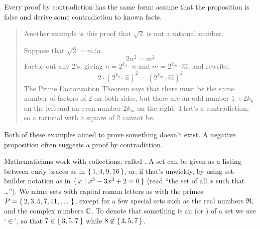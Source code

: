 Every proof by contradiction has the same form: assume that the proposition is
false and derive some contradiction to known facts.

\begin{quote}\small
Another example is this proof that
\( \sqrt{2} \) is not a rational number.

Suppose that  \( \sqrt{2}=m/n \).
\begin{equation*}
   2n^2=m^2
\end{equation*}
Factor out any \( 2 \)'s, giving
\( n=2^{k_n}\cdot \hat{n} \)
and
\( m=2^{k_m}\cdot \hat{m} \),
and rewrite.
\begin{equation*}
  2\cdot (2^{k_n}\cdot \hat{n})^2
  =
  (2^{k_m}\cdot \hat{m})^2
\end{equation*}
The Prime Factorization Theorem says that there must be the same number of
factors of \( 2 \) on both sides, but there are an odd number
\( 1+2k_n \) on the left and an even number \( 2k_m \) on the right.
That's a contradiction, so a rational with a square of
\( 2 \) cannot be.
\end{quote}

Both of these examples aimed to prove something doesn't exist.
A negative proposition often suggests a proof by contradiction.














{}
Mathematicians work with collections, called . 
A set can be given as a listing between curly braces as in
\( \mbox{$\{\, 1,4,9,16 \,\}$} \), or, if that's
unwieldy, by using set-builder notation as in
\( \mbox{$\{\,x\bigm| x^5-3x^3+2=0 \,\}$} \) (read ``the set of all \( x \)
such that \ldots'').
We name sets with capital roman letters as with the primes
\( P=\mbox{$\{\,2,3,5,7,11,\ldots\,\,\}$} \), except for a few special sets such as the
real numbers \( \Re \),
and the complex numbers \( \mathbb{C} \).
To denote that something is an 
(or ) of a set we
use `\( {}\in {} \)',
so that \( 7\in\mbox{$\{\,3,5,7\,\}$} \) while \( 8\not\in\mbox{$\{\,3,5,7\,\}$} \).

